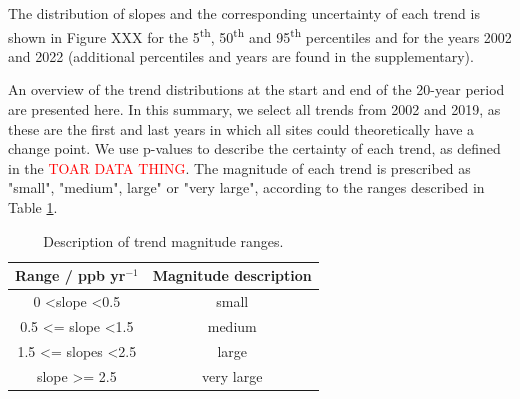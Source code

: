 \documentclass[journal abbreviation, manuscript]{copernicus}
\begin{document}
The distribution of slopes and the corresponding uncertainty of each trend is shown in Figure XXX for the 5\textsuperscript{th}, 50\textsuperscript{th} and 95\textsuperscript{th} percentiles and for the years 2002 and 2022 (additional percentiles and years are found in the supplementary).


An overview of the trend distributions at the start and end of the 20-year period are presented here. In this summary, we select all trends from 2002 and 2019, as these are the first and last years in which all sites could theoretically have a change point. We use p-values to describe the certainty of each trend, as defined in the \textcolor{red}{TOAR DATA THING}. The magnitude of each trend is prescribed as "small", "medium", large" or "very large", according to the ranges described in Table \ref{tab:magnitude_description_table}.

\begin{table}[h]
\caption{Description of trend magnitude ranges.}
\begin{tabular}{c|c}
Range / ppb yr$^{-1}$                 & Magnitude description \\ \hline
0 \textless slope \textless 0.5       & small                 \\
0.5 \textless{}= slope \textless 1.5  & medium              \\
1.5 \textless{}= slopes \textless 2.5 & large                 \\
slope \textgreater{}= 2.5             & very large           
\end{tabular}
\label{tab:magnitude_description_table}
\end{table}


\end{document}
